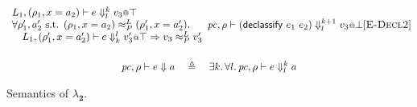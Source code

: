 \documentclass{article}
\makeatletter
\theoremstyle{definition}
\newcommand{\at}{\ensuremath{{\scriptstyle{@}}}}
\newcommand{\pc}{\ensuremath{{\mathit{pc}}}}
\makeatother
\begin{document}
\begin{figure}[ht]
\begin{gather*}
{{\begin{array}{l}
          L_1, (\rho_1, x = a_2) |- e \Downarrow^{k}_{l} v_3 \at \top
          \\
          \forall{\rho_1', a_2' \text{ s.t. }
            (\rho_1, x = a_2) \approx^{L}_{P} (\rho_1', x = a_2')}.
          \\\quad
          L_1, (\rho_1', x = a_2') |- e \Downarrow^{l}_{k} v_3' \at \top =>
          v_3 \approx^{L}_{P} v_3'
        \end{array}}
    }{
      \pc, \rho |- (\mathsf{declassify}\ e_1\ e_2) \Downarrow^{k+1}_{l}
      v_3 \at \bot
    }[\textsc{E-Decl2}]
    \\[3ex]
    \pc, \rho |- e \Downarrow a
    \quad \triangleq \quad
    \exists{k}.\, \forall{l}.\,
    \pc, \rho |- e \Downarrow^{k}_{l} a
  \end{gather*}
  \caption{Semantics of $\lambda_{\mathbf{2}}$.}
  \label{fig:semantics}
\end{figure}
\end{document}
